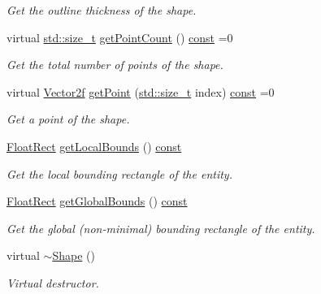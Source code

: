 \begin{DoxyCompactItemize}
\begin{DoxyCompactList}\small\item\em Get the outline thickness of the shape. \end{DoxyCompactList}\item 
virtual \hyperlink{nc__alloc_8h_a7b60c5629e55e8ec87a4547dd4abced4}{std\-::size\-\_\-t} \hyperlink{classsf_1_1_shape_af988dd61a29803fc04d02198e44b5643}{get\-Point\-Count} () \hyperlink{term__entry_8h_a57bd63ce7f9a353488880e3de6692d5a}{const} =0
\begin{DoxyCompactList}\small\item\em Get the total number of points of the shape. \end{DoxyCompactList}\item 
virtual \hyperlink{namespacesf_a80cea3c46537294fd1d8d428566ad8b2}{Vector2f} \hyperlink{classsf_1_1_shape_a40e5d83713eb9f0c999944cf96458085}{get\-Point} (\hyperlink{nc__alloc_8h_a7b60c5629e55e8ec87a4547dd4abced4}{std\-::size\-\_\-t} index) \hyperlink{term__entry_8h_a57bd63ce7f9a353488880e3de6692d5a}{const} =0
\begin{DoxyCompactList}\small\item\em Get a point of the shape. \end{DoxyCompactList}\item 
\hyperlink{namespacesf_ab0d978f5903922a6bdfca1736b71ccc9}{Float\-Rect} \hyperlink{classsf_1_1_shape_a5d26a18ccfe850ff8d327ca97edbc34a}{get\-Local\-Bounds} () \hyperlink{term__entry_8h_a57bd63ce7f9a353488880e3de6692d5a}{const} 
\begin{DoxyCompactList}\small\item\em Get the local bounding rectangle of the entity. \end{DoxyCompactList}\item 
\hyperlink{namespacesf_ab0d978f5903922a6bdfca1736b71ccc9}{Float\-Rect} \hyperlink{classsf_1_1_shape_a5257341fe832884dbba6b9dc855e33cc}{get\-Global\-Bounds} () \hyperlink{term__entry_8h_a57bd63ce7f9a353488880e3de6692d5a}{const} 
\begin{DoxyCompactList}\small\item\em Get the global (non-\/minimal) bounding rectangle of the entity. \end{DoxyCompactList}\item 
virtual \hyperlink{classsf_1_1_shape_a2262aceb9df52d4275c19633592f19bf}{$\sim$\-Shape} ()
\begin{DoxyCompactList}\small\item\em Virtual destructor. \end{DoxyCompactList}\item 

\end{DoxyCompactItemize}
